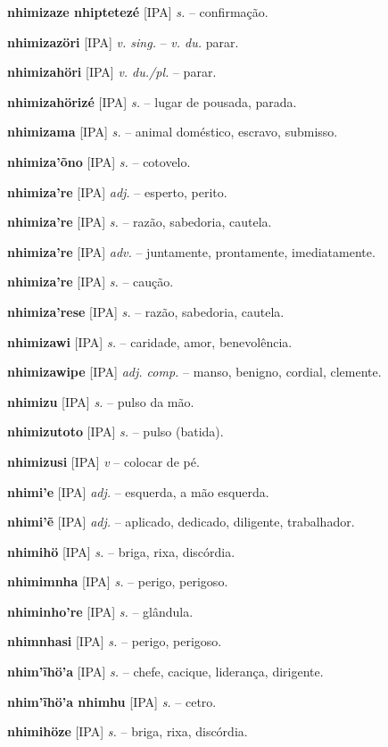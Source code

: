 \textbf{nhimizaze nhiptetezé} [IPA] \textit{s.} -- confirmação.

\textbf{nhimizazöri} [IPA] \textit{v. sing.} -- \textit{v. du.} parar.

\textbf{nhimizahöri} [IPA] \textit{v. du./pl.} -- parar.

\textbf{nhimizahörizé} [IPA] \textit{s.} -- lugar de pousada, parada.

\textbf{nhimizama} [IPA] \textit{s.} -- animal doméstico, escravo, submisso.

\textbf{nhimiza'õno} [IPA] \textit{s.} -- cotovelo.

\textbf{nhimiza're} [IPA] \textit{adj.} -- esperto, perito.

\textbf{nhimiza're} [IPA] \textit{s.} -- razão, sabedoria, cautela.

\textbf{nhimiza're} [IPA] \textit{adv.} -- juntamente, prontamente, imediatamente.

\textbf{nhimiza're} [IPA] \textit{s.} -- caução.

\textbf{nhimiza'rese} [IPA] \textit{s.} -- razão, sabedoria, cautela.

\textbf{nhimizawi} [IPA] \textit{s.} -- caridade, amor, benevolência.

\textbf{nhimizawipe} [IPA] \textit{adj. comp.} -- manso, benigno, cordial, clemente.

\textbf{nhimizu} [IPA] \textit{s.} -- pulso da mão.

\textbf{nhimizutoto} [IPA] \textit{s.} -- pulso (batida).

\textbf{nhimizusi} [IPA] \textit{v} -- colocar de pé.

\textbf{nhimi'e} [IPA] \textit{adj.} -- esquerda, a mão esquerda.

\textbf{nhimi'ẽ} [IPA] \textit{adj.} -- aplicado, dedicado, diligente, trabalhador.

\textbf{nhimihö} [IPA] \textit{s.} -- briga, rixa, discórdia.

\textbf{nhimimnha} [IPA] \textit{s.} -- perigo, perigoso.

\textbf{nhiminho're} [IPA] \textit{s.} -- glândula.

\textbf{nhimnhasi} [IPA] \textit{s.} -- perigo, perigoso.

\textbf{nhim'ĩhö'a} [IPA] \textit{s.} -- chefe, cacique, liderança, dirigente.

\textbf{nhim'ĩhö'a nhimhu} [IPA] \textit{s.} -- cetro.

\textbf{nhimihöze} [IPA] \textit{s.} -- briga, rixa, discórdia.

